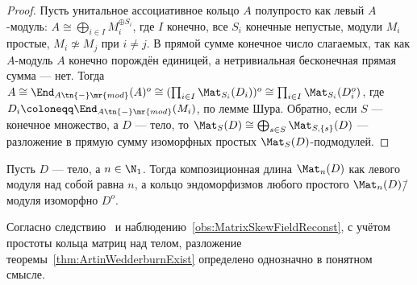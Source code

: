 \documentclass[
	extrafontsizes,
	11pt,
	hyphens,
]{memoir}
\begin{document}
\begin{proof}
Пусть унитальное ассоциативное кольцо \(A\) полупросто как левый \(A\)-мо\-дуль: \(A \cong \bigoplus_{i \in I} M_i^{\oplus S_i}\), где \(I\) конечно, все \(S_i\) конечные непустые, модули \(M_i\) простые, \(M_i \not\simeq M_j\) при \(i \neq j\). В прямой сумме конечное число слагаемых, так как \(A\)-мо\-дуль \(A\) конечно порождён единицей, а нетривиальная бесконечная прямая сумма --- нет. Тогда
\(A \cong \End_{A\tn{-}\mr{mod}}(A)^o \cong (\prod_{i \in I} \Mat_{S_i}(D_i))^o \cong \prod_{i \in I} \Mat_{S_i}(D_i^o)\),
где \(D_i \coloneqq \End_{A\tn{-}\mr{mod}}(M_i)\),
по лемме Шура.
Обратно, если \(S\) --- конечное множество, а \(D\) --- тело, то \(\Mat_S(D) \cong \bigoplus_{s \in S} \Mat_{S, \{s\}}(D)\) --- разложение в прямую сумму изоморфных простых \(\Mat_S(D)\)-под\-мо\-ду\-лей.
\end{proof}

\begin{observation}
Пусть \(D\) --- тело, а \(n \in \N_1\).%
\label{obs:MatrixSkewFieldReconst}
Тогда композиционная длина \(\Mat_n(D)\) как левого модуля над собой равна \(n\), а кольцо эндоморфизмов любого простого \(\Mat_n(D)\)\=/модуля изоморфно \(D^o\).
\end{observation}

\begin{observation}
Согласно следствию~ и наблюдению~\ref{obs:MatrixSkewFieldReconst},
с учётом простоты кольца матриц над телом,
разложение теоремы~\ref{thm:ArtinWedderburnExist} определено однозначно в понятном смысле.
\end{observation}
\end{document}
